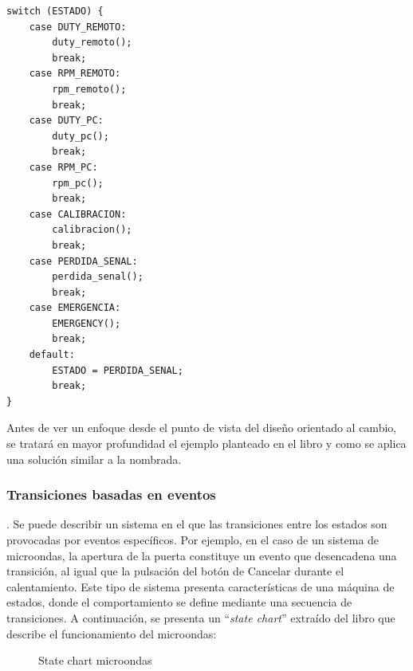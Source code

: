 \begin{lstlisting}[caption=Main loop del previo firmware del robot desmalezador, label={codigoLoopMain}]
switch (ESTADO) {
	case DUTY_REMOTO:
		duty_remoto();
		break;
	case RPM_REMOTO:
		rpm_remoto();
		break;
	case DUTY_PC:
		duty_pc();
		break;
	case RPM_PC:
		rpm_pc();
		break;	
	case CALIBRACION:
		calibracion();
		break;
	case PERDIDA_SENAL:
		perdida_senal();
		break;
	case EMERGENCIA:
		EMERGENCY();
		break;
	default:
		ESTADO = PERDIDA_SENAL;
		break;
}
\end{lstlisting}

Antes de ver un enfoque desde el punto de vista del diseño orientado al cambio, se tratará en mayor profundidad el ejemplo planteado en el libro y como se aplica una solución similar a la nombrada.

\subsubsection*{Transiciones basadas en eventos}.
Se puede describir un sistema en el que las transiciones entre los estados son provocadas por eventos específicos. Por ejemplo, en el caso de un sistema de microondas, la apertura de la puerta constituye un evento que desencadena una transición, al igual que la pulsación del botón de Cancelar durante el calentamiento. Este tipo de sistema presenta características de una máquina de estados, donde el comportamiento se define mediante una secuencia de transiciones. A continuación, se presenta un ``\textit{state chart}'' extraído del libro que describe el funcionamiento del microondas:


\begin{figure}[h]
\caption{State chart microondas}
\begin{center}
\end{center}
\end{figure}

